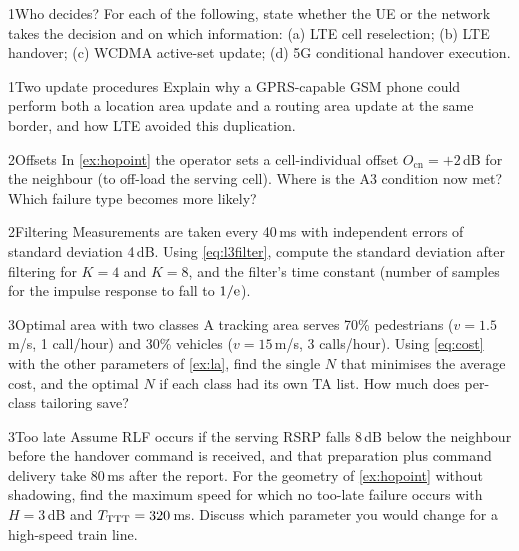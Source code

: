 \documentclass[11pt,a4paper]{article}
\begin{document}
\begin{exercisebox}{1}{Who decides?}\label{exr:who}
For each of the following, state whether the UE or the network takes the decision and on which
information: (a) LTE cell reselection; (b) LTE handover; (c) WCDMA active-set update; (d) 5G
conditional handover execution.
\end{exercisebox}

\begin{exercisebox}{1}{Two update procedures}\label{exr:lara}
Explain why a GPRS-capable GSM phone could perform both a location area update and a routing area
update at the same border, and how LTE avoided this duplication.
\end{exercisebox}

\begin{exercisebox}{2}{Offsets}\label{exr:offsets}
In \cref{ex:hopoint} the operator sets a cell-individual offset $O_\mathrm{cn} = +2$\,dB for the
neighbour (to off-load the serving cell). Where is the A3 condition now met? Which failure type
becomes more likely?
\end{exercisebox}

\begin{exercisebox}{2}{Filtering}\label{exr:filter}
Measurements are taken every 40\,ms with independent errors of standard deviation 4\,dB. Using
\cref{eq:l3filter}, compute the standard deviation after filtering for $K=4$ and $K=8$, and the
filter's time constant (number of samples for the impulse response to fall to $1/\mathrm{e}$).
\end{exercisebox}

\begin{exercisebox}{3}{Optimal area with two classes}\label{exr:twoclass}
A tracking area serves 70\% pedestrians ($v=1.5$\,m/s, 1 call/hour) and 30\% vehicles
($v=15$\,m/s, 3 calls/hour). Using \cref{eq:cost} with the other parameters of \cref{ex:la},
find the single $N$ that minimises the average cost, and the optimal $N$ if each class had its
own TA list. How much does per-class tailoring save?
\end{exercisebox}

\begin{exercisebox}{3}{Too late}\label{exr:late}
Assume RLF occurs if the serving RSRP falls 8\,dB below the neighbour before the handover command
is received, and that preparation plus command delivery take 80\,ms after the report. For the
geometry of \cref{ex:hopoint} without shadowing, find the maximum speed for which no too-late
failure occurs with $H = 3$\,dB and $T_{\mathrm{TTT}} = 320$\,ms. Discuss which parameter you would change for
a high-speed train line.
\end{exercisebox}
\end{document}
